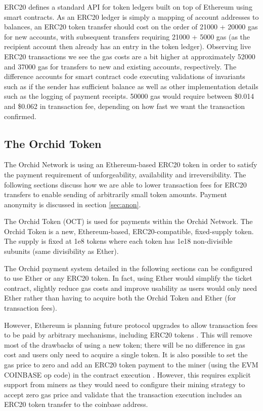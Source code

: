 ERC20\cite{ERC20} defines a standard API for token ledgers built on top of Ethereum using smart contracts. As an ERC20 ledger is simply a mapping of account addresses to balances, an ERC20 token transfer should cost on the order of 21000 + 20000 gas for new accounts, with subsequent transfers requiring 21000 + 5000 gas (as the recipient account then already has an entry in the token ledger). Observing live\cite{LiveERC20} ERC20 transactions we see the gas costs are a bit higher at approximately 52000 and 37000 gas for transfers to new and existing accounts, respectively. The difference accounts for smart contract code executing validations of invariants such as if the sender has sufficient balance as well as other implementation details such as the logging of payment receipts. 50000 gas would require between \$0.014 and \$0.062 in transaction fee, depending on how fast we want the transaction confirmed.

\subsection{The Orchid Token}
\label{sec:oct}

The Orchid Network is using an Ethereum-based ERC20 token in order to satisfy the payment requirement of unforgeability, availability and irreversibility. The following sections discuss how we are able to lower transaction fees for ERC20 transfers to enable sending of arbitrarily small token amounts. Payment anonymity is discussed in section \ref{sec:anon}.

The Orchid Token (OCT) is used for payments within the Orchid Network. The Orchid Token is a new, Ethereum-based, ERC20-compatible, fixed-supply token. The supply is fixed at 1e8 tokens where each token has 1e18 non-divisible subunits (same divisibility as Ether).

The Orchid payment system detailed in the following sections can be configured to use Ether or any ERC20 token. In fact, using Ether would simplify the ticket contract, slightly reduce gas costs and improve usability as users would only need Ether rather than having to acquire both the Orchid Token and Ether (for transaction fees).

However, Ethereum is planning future protocol upgrades to allow transaction fees to be paid by arbitrary mechanisms, including ERC20 tokens \cite{ETHAbstractions} \cite{ETHSerenity}. This will remove most of the drawbacks of using a new token; there will be no difference in gas cost and users only need to acquire a single token. It is also possible to set the gas price to zero and add an ERC20 token payment to the miner (using the EVM COINBASE\cite{ETHSpec} op code) in the contract execution \cite{ETHTokenFees}. However, this requires explicit support from miners as they would need to configure their mining strategy to accept zero gas price and validate that the transaction execution includes an ERC20 token transfer to the coinbase address.

